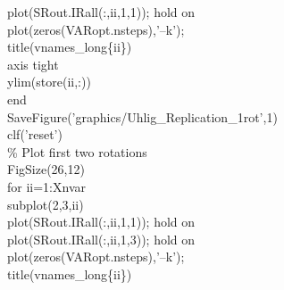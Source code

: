 \hspace{1mm}\hspace{5mm} plot(SRout.IRall(:,ii,1,1)); hold on \\ 
\hspace{1mm}\hspace{5mm} plot(zeros(VARopt.nsteps),\textcolor{matlabpurple}{'--k'}); \\ 
\hspace{1mm}\hspace{5mm} title(vnames\_long\{ii\}) \\ 
\hspace{1mm}\hspace{5mm} axis tight \\ 
\hspace{1mm}\hspace{5mm} ylim(store(ii,:)) \\ 
\hspace{1mm}\textcolor{matlabblue}{end} \\ 
\hspace{1mm}SaveFigure(\textcolor{matlabpurple}{'graphics/Uhlig\_Replication\_1rot'},1) \\ 
\hspace{1mm}clf(\textcolor{matlabpurple}{'reset'}) \\ 
\hspace{1mm}\textcolor{matlabgreen}{\% Plot first two rotations }\\ 
\hspace{1mm}FigSize(26,12) \\ 
\hspace{1mm}\textcolor{matlabblue}{for} ii=1:Xnvar \\ 
\hspace{1mm}\hspace{5mm} subplot(2,3,ii) \\ 
\hspace{1mm}\hspace{5mm} plot(SRout.IRall(:,ii,1,1)); hold on \\ 
\hspace{1mm}\hspace{5mm} plot(SRout.IRall(:,ii,1,3)); hold on \\ 
\hspace{1mm}\hspace{5mm} plot(zeros(VARopt.nsteps),\textcolor{matlabpurple}{'--k'}); \\ 
\hspace{1mm}\hspace{5mm} title(vnames\_long\{ii\}) \\ 

